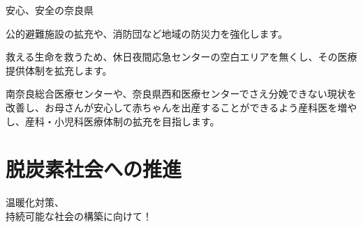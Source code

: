 \documentclass[dvipdfmx]{beamer}
\begin{document}
    \begin{frame}{安心、安全の奈良県}{}
        \begin{small}
            \begin{description}
                \setlength{\parsep}{.5mm}
                \setlength{\itemsep}{2mm}
                \item[南海トラフ巨大地震や大規模風水害などの自然災害に備える対策の強化] \mbox{}\par
                公的避難施設の拡充や、消防団など地域の防災力を強化します。
                \item[休日夜間救急医療センターの拡充] \mbox{}\par
                救える生命を救うため、休日夜間応急センターの空白エリアを無くし、その医療提供体制を拡充します。
                \item[安心して生み育てることができる産科・小児科医療体制の拡充] \mbox{}\par
                南奈良総合医療センターや、奈良県西和医療センターでさえ分娩できない現状を改善し、お母さんが安心して赤ちゃんを出産することができるよう産科医を増やし、産科・小児科医療体制の拡充を目指します。
            \end{description}
        \end{small}
    \end{frame}

\section{脱炭素社会への推進}
    \begin{frame}{}{}
        \sectionpage
        \begin{center}
            \begin{large}
                \alert{温暖化対策、}\\\alert{持続可能な社会の構築に向けて！}
            \end{large}
        \end{center}
    \end{frame}
\end{document}
